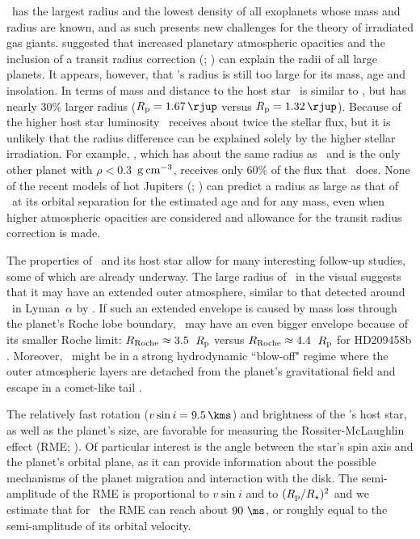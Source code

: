 \tresFour\ has the largest radius and the lowest density of all exoplanets whose 
mass and radius are known, and as such presents new challenges for the theory 
of irradiated gas giants. \citet{Burrows_Hubeny_Budaj:apj:2007a} suggested that increased planetary atmospheric opacities and the inclusion of a transit radius correction 
(\citealp{Baraffe_Chabrier_Barman:aa:2003a}; \citealp*{Burrows_Sudarsky_Hubbard:apj:2003a}) can explain the radii of all large planets. It appears, 
however, that \tresFour's radius is still too large for its mass, age and 
insolation. In terms of mass and distance to the host star \tresFour\ is similar 
to \hdTZN, but has nearly 30\% larger radius ($R_{\rm p} = 1.67\,\rjup$ versus $R_{\rm p} = 1.32\,\rjup$). Because of the higher host star luminosity \tresFour\ receives about twice the stellar flux, but it is unlikely that the radius difference can be explained solely by the higher stellar 
irradiation. For example, \hatponeb, which has about the same radius as 
\hdTZN\ and is the only other planet with $\rho < 0.3$~${\rm g \: cm^{-3}}$, 
receives only 60\% of the flux that \hdTZN\ does. None of the recent models 
of hot Jupiters (\citealp*[e.g.,][]{Fortney_Marley_Barnes:apj:2007a}; \citealp{Burrows_Hubeny_Budaj:apj:2007a}) can predict a radius as 
large as that of \tresFour\ at its orbital separation for the estimated age and 
for any mass, even when higher atmospheric opacities are considered and 
allowance for the transit radius correction is made.

The properties of \tresFour\ and its host star allow for many interesting follow-up 
studies, some of which are already underway. The large radius of \tresFour\ in the 
visual suggests that it may have an extended outer atmosphere, similar to that 
detected around \hdTZN\ in Lyman~$\alpha$ by \citet{Vidal-Madjar_Lecavelier-des-Etangs_Desert:nat:2003a}. If such an 
extended envelope is caused by mass loss through the planet's Roche lobe 
boundary, \tresFour\ may have an even bigger envelope because of its smaller 
Roche limit: $R_{\rm Roche} \approx 3.5$~$R_{\rm p}$ versus 
$R_{\rm Roche} \approx 4.4$~$R_{\rm p}$ for HD209458b \citep{Erkaev_Lammer_Kulikov:preprint:2007a}. 
Moreover, \tresFour\ might be in a strong hydrodynamic ``blow-off" regime where the 
outer atmospheric layers are detached from the planet's gravitational field and 
escape in a comet-like tail \citep{Vidal-Madjar_Lecavelier-des-Etangs_Desert:nat:2003a, Lecavelier-des-Etangs_Vidal-Madjar_McConnell:aa:2004a}.

The relatively fast rotation ($v \sin i = 9.5 \, \kms$) and brightness of the 
\tresFour's host star, as well as the planet's size, are favorable for measuring 
the Rossiter-McLaughlin effect (RME; \citealp[see, e.g.,][]{Gaudi_Winn:apj:2007a}). Of 
particular interest is the angle between the star's spin axis and the planet's 
orbital plane, as it can provide information about the possible mechanisms of 
the planet migration and interaction with the disk. The semi-amplitude of the 
RME is proportional to $v \sin i$ and to $(R_{\rm p} / R_{\star})^2$ and we 
estimate that for \tresFour\ the RME can reach about $90~\ms$, or roughly equal to 
the semi-amplitude of its orbital velocity. 



